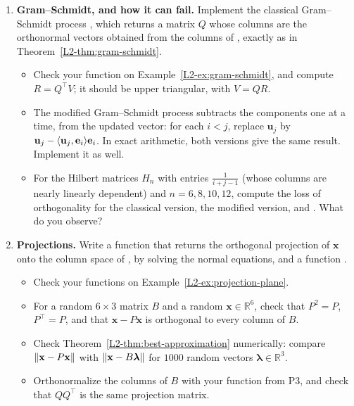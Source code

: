 \begin{enumerate}[label=\textbf{P\arabic*.}, leftmargin=*]
    \item \textbf{Gram--Schmidt, and how it can fail.} Implement the classical Gram--Schmidt process , which returns a matrix $Q$ whose columns are the orthonormal vectors obtained from the columns of , exactly as in Theorem~\ref{L2-thm:gram-schmidt}.
    \begin{itemize}
        \item Check your function on Example~\ref{L2-ex:gram-schmidt}, and compute $R = Q^\top V$; it should be upper triangular, with $V = QR$.
        \item The modified Gram--Schmidt process subtracts the components one at a time, from the updated vector: for each $i < j$, replace $\mathbf{u}_j$ by $\mathbf{u}_j - \langle \mathbf{u}_j, \mathbf{e}_i \rangle \mathbf{e}_i$. In exact arithmetic, both versions give the same result. Implement it as well.
        \item For the Hilbert matrices $H_n$ with entries $\frac{1}{i + j - 1}$ (whose columns are nearly linearly dependent) and $n = 6, 8, 10, 12$, compute the loss of orthogonality  for the classical version, the modified version, and . What do you observe?
    \end{itemize}

    \item \textbf{Projections.} Write a function  that returns the orthogonal projection of $\mathbf{x}$ onto the column space of , by solving the normal equations, and a function .
    \begin{itemize}
        \item Check your functions on Example~\ref{L2-ex:projection-plane}.
        \item For a random $6 \times 3$ matrix $B$ and a random $\mathbf{x} \in \mathbb{R}^6$, check that $P^2 = P$, $P^\top = P$, and that $\mathbf{x} - P\mathbf{x}$ is orthogonal to every column of $B$.
        \item Check Theorem~\ref{L2-thm:best-approximation} numerically: compare $\lVert \mathbf{x} - P\mathbf{x} \rVert$ with $\lVert \mathbf{x} - B\boldsymbol{\lambda} \rVert$ for $1000$ random vectors $\boldsymbol{\lambda} \in \mathbb{R}^3$.
        \item Orthonormalize the columns of $B$ with your function from P3, and check that $QQ^\top$ is the same projection matrix.
    \end{itemize}


\end{enumerate}

